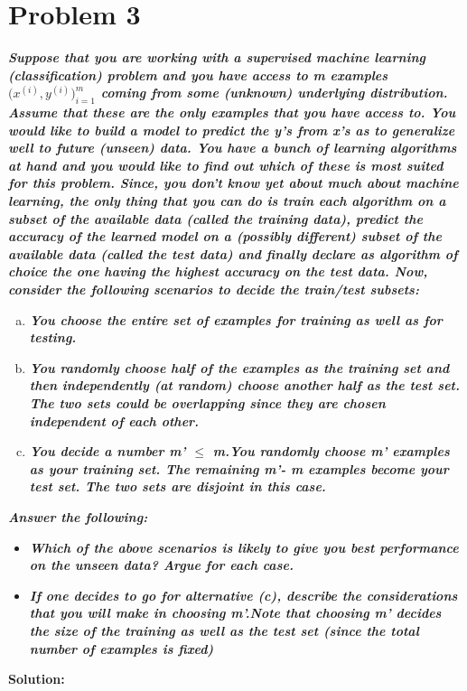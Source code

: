 \documentclass[12pt,letterpaper]{article}
\begin{document}
\section*{Problem 3}
\textbf{\emph{Suppose that you are working with a supervised machine learning (classification) problem and you have access to m examples ${(x^{(i)} , y^{(i)}})^{m}_{i=1}$ coming from some (unknown) underlying distribution.
Assume that these are the only examples that you have access to. You would like to build a model to predict the y's from x's as to generalize well to future (unseen) data. You have a bunch of learning
algorithms at hand and you would like to find out which of these is most suited for this problem. Since, you don’t know yet about much about machine learning, the only thing that you can do is train each
algorithm on a subset of the available data (called the training data), predict the accuracy of the learned model on a (possibly different) subset of the available data (called the test data) and finally declare as algorithm of choice the one having the highest accuracy on the test data. Now, consider the following scenarios to decide the train/test subsets:
}}
\begin{enumerate}[a.]
    \item\textbf{\emph{You choose the entire set of examples for training as well as for testing. }}
    \item\textbf{\emph{You randomly choose half of the examples as the training set and then independently (at random) choose another half as the test set. The two sets could be overlapping since they are chosen independent of each other. }}
    \item\textbf{\emph{You decide a number m' $\leq$ m.You randomly choose m' examples as your training set. The remaining m'- m examples become your test set. The two sets are disjoint in this case. }}
\end{enumerate}
\textbf{\emph{
Answer the following:
}}
\begin{itemize}
    \item\textbf{\emph{Which of the above scenarios is likely to give you best performance on the unseen data? Argue for each case. }}
    \item\textbf{\emph{If one decides to go for alternative (c), describe the considerations that you will make in choosing m'.Note that choosing m' decides the size of the training as well as the test set (since the total number of examples is fixed)}}
\end{itemize}
\textbf{Solution:}
\end{document}
